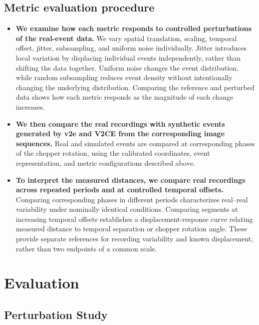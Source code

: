 \subsection{Metric evaluation procedure}

\begin{itemize}

  \item \textbf{We examine how each metric responds to controlled perturbations of the real-event data.} We vary spatial translation, scaling, temporal offset, jitter, subsampling, and uniform noise individually. Jitter introduces local variation by displacing individual events independently, rather than shifting the data together. Uniform noise changes the event distribution, while random subsampling reduces event density without intentionally changing the underlying distribution. Comparing the reference and perturbed data shows how each metric responds as the magnitude of each change increases.

  \item \textbf{We then compare the real recordings with synthetic events generated by v2e and V2CE from the corresponding image sequences.} Real and simulated events are compared at corresponding phases of the chopper rotation, using the calibrated coordinates, event representation, and metric configurations described above.

  \item \textbf{To interpret the measured distances, we compare real recordings across repeated periods and at controlled temporal offsets.} Comparing corresponding phases in different periods characterizes real–real variability under nominally identical conditions. Comparing segments at increasing temporal offsets establishes a displacement-response curve relating measured distance to temporal separation or chopper rotation angle. These provide separate references for recording variability and known displacement, rather than two endpoints of a common scale.
\end{itemize}



\section{Evaluation}

\subsection{Perturbation Study}

